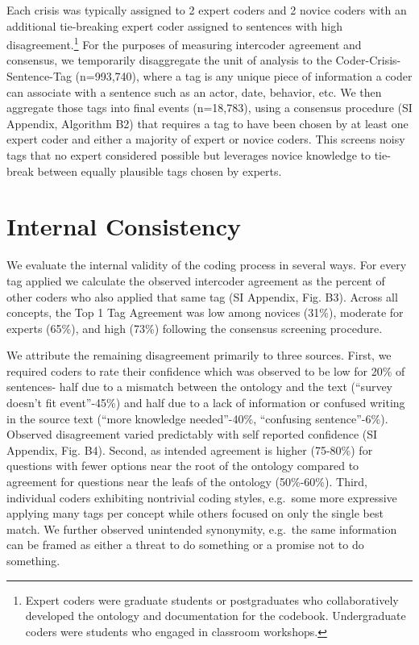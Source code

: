 \documentclass[9pt,twocolumn,twoside,lineno]{pnas-new}
\begin{document}
Each crisis was typically assigned to 2 expert coders and 2 novice
coders with an additional tie-breaking expert coder assigned to
sentences with high disagreement.\footnote{Expert coders were graduate
  students or postgraduates who collaboratively developed the ontology
  and documentation for the codebook. Undergraduate coders were students
  who engaged in classroom workshops.} For the purposes of measuring
intercoder agreement and consensus, we temporarily disaggregate the unit
of analysis to the Coder-Crisis-Sentence-Tag (n=993,740), where a tag is
any unique piece of information a coder can associate with a sentence
such as an actor, date, behavior, etc. We then aggregate those tags into
final events (n=18,783), using a consensus procedure (SI Appendix,
Algorithm B2) that requires a tag to have been chosen by at least one
expert coder and either a majority of expert or novice coders. This
screens noisy tags that no expert considered possible but leverages
novice knowledge to tie-break between equally plausible tags chosen by
experts.

\hypertarget{internal-consistency}{%
\section*{Internal Consistency}\label{internal-consistency}}

We evaluate the internal validity of the coding process in several ways.
For every tag applied we calculate the observed intercoder agreement as
the percent of other coders who also applied that same tag (SI Appendix,
Fig. B3). Across all concepts, the Top 1 Tag Agreement was low among
novices (31\%), moderate for experts (65\%), and high (73\%) following
the consensus screening procedure.

We attribute the remaining disagreement primarily to three sources.
First, we required coders to rate their confidence which was observed to
be low for 20\% of sentences- half due to a mismatch between the
ontology and the text (``survey doesn't fit event''-45\%) and half due
to a lack of information or confused writing in the source text (``more
knowledge needed''-40\%, ``confusing sentence''-6\%). Observed
disagreement varied predictably with self reported confidence (SI
Appendix, Fig. B4). Second, as intended agreement is higher (75-80\%)
for questions with fewer options near the root of the ontology compared
to agreement for questions near the leafs of the ontology (50\%-60\%).
Third, individual coders exhibiting nontrivial coding styles, e.g.~some
more expressive applying many tags per concept while others focused on
only the single best match. We further observed unintended synonymity,
e.g.~the same information can be framed as either a threat to do
something or a promise not to do something.
\end{document}
